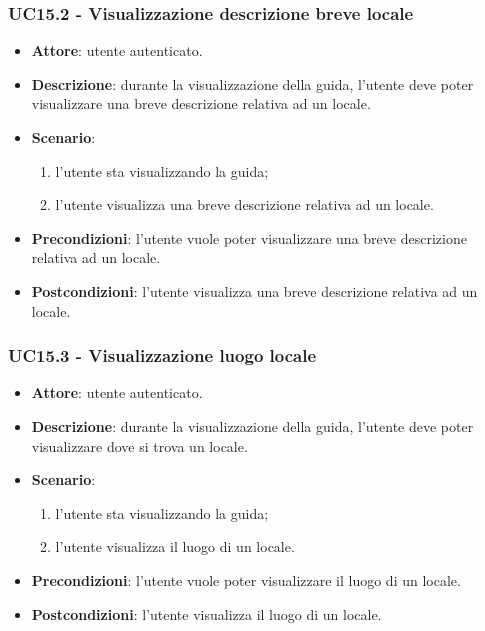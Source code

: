 \subsubsection{UC15.2 - Visualizzazione descrizione breve locale}
\begin{itemize}
    \item \textbf{Attore}: utente autenticato.
    \item \textbf{Descrizione}: durante la visualizzazione della guida, l'utente deve poter visualizzare una breve descrizione relativa ad un locale.
    \item \textbf{Scenario}:
    \begin{enumerate}
        \item l'utente sta visualizzando la guida;
        \item l'utente visualizza una breve descrizione relativa ad un locale.
    \end{enumerate}
    \item \textbf{Precondizioni}: l'utente vuole poter visualizzare una breve descrizione relativa ad un locale.
    \item \textbf{Postcondizioni}: l'utente visualizza una breve descrizione relativa ad un locale.
\end{itemize}

\subsubsection{UC15.3 - Visualizzazione luogo locale}
\begin{itemize}
    \item \textbf{Attore}: utente autenticato.
    \item \textbf{Descrizione}: durante la visualizzazione della guida, l'utente deve poter visualizzare dove si trova un locale.
    \item \textbf{Scenario}:
    \begin{enumerate}
        \item l'utente sta visualizzando la guida;
        \item l'utente visualizza il luogo di un locale.
    \end{enumerate}
    \item \textbf{Precondizioni}: l'utente vuole poter visualizzare il luogo di un locale.
    \item \textbf{Postcondizioni}: l'utente visualizza il luogo di un locale.
\end{itemize}

